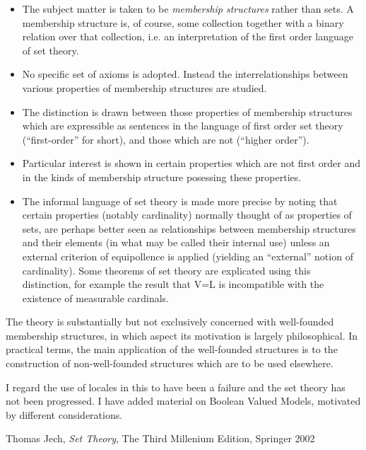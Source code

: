 \documentclass[11pt,a4paper]{article}
\begin{document}
\begin{itemize}

\item The subject matter is taken to be {\it membership structures} rather than sets.
A membership structure is, of course, some collection together with a binary relation over that collection, i.e. an interpretation of the first order language of set theory.

\item No specific set of axioms is adopted.
Instead the interrelationships between various properties of membership structures are studied.

\item The distinction is drawn between those properties of membership structures which are expressible as sentences in the language of first order set theory (``first-order'' for short), and those which are not (``higher order'').

\item Particular interest is shown in certain properties which are not first order and in the kinds of membership structure posessing these properties.

\item The informal language of set theory is made more precise by noting that certain properties (notably cardinality) normally thought of as properties of sets, are perhaps better seen as relationships between membership structures and their elements (in what may be called their internal use) unless an external criterion of equipollence is applied (yielding an ``external'' notion of cardinality).
Some theorems of set theory are explicated using this distinction, for example the result that V=L is incompatible with the existence of measurable cardinals.
\end{itemize}

The theory is substantially but not exclusively concerned with well-founded membership structures, in which aspect its motivation is largely philosophical.
In practical terms, the main application of the well-founded structures is to the construction of non-well-founded structures which are to be used elsewhere.

I regard the use of locales in this to have been a failure and the set theory has not been progressed.
I have added material on Boolean Valued Models, motivated by different considerations.




\begin{thebibliography}{99}

 Thomas Jech, \emph{Set Theory}, The Third Millenium Edition, Springer 2002

\end{thebibliography}
\end{document}
